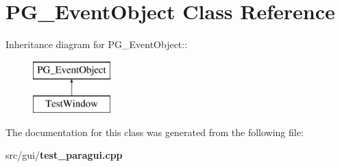 \section{PG\_\-Event\-Object Class Reference}
\label{classPG__EventObject}
Inheritance diagram for PG\_\-Event\-Object::\begin{figure}[H]
\begin{center}
\leavevmode
\includegraphics[height=2cm]{classPG__EventObject}
\end{center}
\end{figure}


The documentation for this class was generated from the following file:\begin{CompactItemize}
\item 
src/gui/{\bf test\_\-paragui.cpp}\end{CompactItemize}
